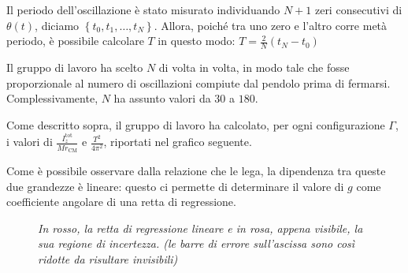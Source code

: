 \documentclass{article}
\begin{document}

\pagebreak
Il periodo dell'oscillazione è stato misurato individuando $N+1$ zeri
consecutivi di $\theta(t)$, diciamo $\left\{t_0,t_1,\dots,t_N\right\}$.
Allora, poiché tra uno zero e l'altro corre metà periodo, è possibile
calcolare $T$ in questo modo: $T = \frac{2}{N}(t_N - t_0)$

Il gruppo di lavoro ha scelto $N$ di volta in volta, in modo tale che
fosse proporzionale al numero di oscillazioni compiute dal pendolo
prima di fermarsi. Complessivamente, $N$ ha assunto valori da $30$ a
$180$.

\vspace{2mm}

Come descritto sopra, il gruppo di lavoro ha calcolato, per ogni
configurazione $\Gamma$,
i valori di $\frac{I_z^\text{tot}}{Mr_\text{CM}}$
e $\frac{T^2}{4\pi^2}$, riportati nel grafico seguente.

Come è possibile osservare dalla relazione che le lega, la dipendenza
tra queste due grandezze è lineare: questo ci permette di determinare
il valore di $g$ come coefficiente angolare di una retta di regressione.

\begin{center}
\begin{figure}[H]
  \caption[]{\emph{
    In rosso, la retta di regressione lineare e in rosa,
    appena visibile, la sua regione di incertezza.
    (le barre di errore sull'ascissa sono così ridotte
    da risultare invisibili)
  }}
\end{figure}
\end{center}
\end{document}
